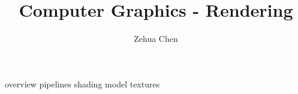 \documentclass[letterpaper, 11pt]{report}
\title{Computer Graphics - Rendering}
\author{Zehua Chen}
\begin{document}
  \maketitle
  \tableofcontents

  {overview}
  {pipelines}
  {shading}
  {model}
  {textures}
\end{document}
